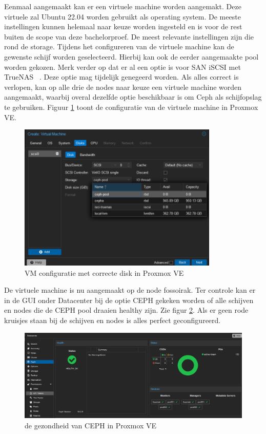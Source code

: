 Eenmaal aangemaakt kan er een virtuele machine worden aangemakt. Deze virtuele zal Ubuntu 22.04 worden gebruikt als operating system.
De meeste instellingen kunnen helemaal naar keuze worden ingesteld en is voor de rest buiten de scope van deze bachelorproef. De meest relevante instellingen zijn die rond de storage.
Tijdens het configureren van de virtuele machine kan de gewenste schijf worden geselecteerd. Hierbij kan ook de eerder aangemaakte pool worden gekozen.
Merk verder op dat er al een optie is voor SAN iSCSI met TrueNAS~\autocite{truenas} . Deze optie mag tijdelijk genegeerd worden.
Als alles correct is verlopen, kan op alle drie de nodes naar keuze een virtuele machine worden aangemaakt, waarbij overal dezelfde optie beschikbaar is om Ceph als schijfopslag te gebruiken.
Figuur \ref{fig:vm-storage-proxmox} toont de configuratie van de virtuele machine in Proxmox VE.
\begin{figure}[H]
  \centering
  \includegraphics[width=0.85\textwidth, trim=3cm 0cm 3cm 0cm, clip]{../poc/vm-storage-prox.png}
  \caption{VM configuratie met correcte disk in Proxmox VE}
  \label{fig:vm-storage-proxmox}
\end{figure}

De virtuele machine is nu aangemaakt op de node fossoirak.
Ter controle kan er in de GUI onder Datacenter bij de optie CEPH gekeken worden of alle schijven en nodes die de CEPH pool draaien healthy zijn. Zie figur \ref{fig:ceph-healthy-prox}.
Als er geen rode kruisjes staan bij de schijven en nodes is alles perfect geconfigureerd.
\begin{figure}[H]
  \centering
  \includegraphics[width=1.1\textwidth]{../poc/ceph-healthy-prox.png}
  \caption{de gezondheid van CEPH  in Proxmox VE}
  \label{fig:ceph-healthy-prox}
\end{figure}

